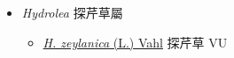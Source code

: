 
  \begin{itemize}
 \item[] \textit{Hydrolea} 探芹草屬
                                
  \begin{itemize}
        \item[] \href{http://www.theplantlist.org/tpl1.1/search?q=Hydrolea+zeylanica}{\textit{H. zeylanica} (L.) Vahl}   探芹草   VU
  \end{itemize}
  \end{itemize}
